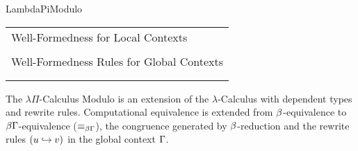 \begin{entry}{LambdaPiModulo}
\begin{calculus}
\begin{tabular}{c}
	\multicolumn{1}{l}{\sc Well-Formedness for Local Contexts} \\[0.5cm]

	\AxCb{$\wf{\Ga}$}
	\UICb{$\typctx{\emptyset}$}
	\DPb{}
	\quad

	\AxCb{$\typctx{\De}$}
	\AxCb{$\typg{\De}{U}{\Type}$}
	\AxCb{$x \notin dom(\De)$}
	\TICb{$\typctx{\De(x:U)}$}
	\DPb{}
	\\[0.5cm]

	\multicolumn{1}{l}{\sc Well-Formedness Rules for Global Contexts}  \\[0.5cm]
	\AxCb{}
	\UICb{$\wf{\emptyset}$}
	\DPb{}
	\quad

	\AxCb{$\wf{\Ga}$}
	\AxCb{$\typg{\emptyset}{U}{\Type}$}
	\BICb{$\wf{\Ga(c:U)}$}
	\DPb{}
	\quad

	\AxCb{$\wf{\Ga}$}
	\AxCb{$\typg{\emptyset}{K}{\Kind}$}
	\BICb{$\wf{\Ga(C:K)}$}
	\DPb{}
	\\[0.5cm]

	\AxCb{$\wf{\Ga}$}
	\AxCb{$\red_{\be} \cup \red_{\Ga\Xi}$ is confluent}
	\AxCb{$(\forall i)\Ga \vdash u_i \rw v_i$}
	\noLine{}
	\UICb{$\Xi = (u_1\rw v_1)\ldots(u_n\rw v_n)$}
	\TICb{$\wf{\Ga\Xi}$}
	\DPb{}
\end{tabular}

\end{calculus}


\begin{clarifications}
	The $\lambda\Pi$-Calculus Modulo is an extension of the $\lambda$-Calculus with dependent types and rewrite rules.
	Computational equivalence is extended from $\beta$-equivalence to $\beta\Gamma$-equivalence ($\equiv_{\beta\Gamma}$),
	the congruence generated by $\beta$-reduction and the rewrite rules $(u\hookrightarrow v)$ in the global context $\Gamma$.
\end{clarifications}


\end{entry}
